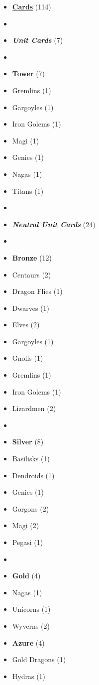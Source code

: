 \begin{multicols}{3}
\begin{itemize}[leftmargin=0pt, label={}, noitemsep]
  \item \textbf{\small{\underline{Cards}}} (114)
  \item
  \item \textbf{\emph{Unit Cards}} (7)
  \item
  \item \textbf{Tower} (7)
  \item Gremlins (1)
  \item Gargoyles (1)
  \item Iron Golems (1)
  \item Magi (1)
  \item Genies (1)
  \item Nagas (1)
  \item Titans (1)
  \item
  \item \textbf{\emph{Neutral Unit Cards}} (24)
  \item
  \item \textbf{Bronze} (12)
  \item Centaurs (2)
  \item Dragon Flies (1)
  \item Dwarves (1)
  \item Elves (2)
  \item Gargoyles (1)
  \item Gnolls (1)
  \item Gremlins (1)
  \item Iron Golems (1)
  \item Lizardmen (2)
  \item
  \item \textbf{Silver} (8)
  \item Basilisks (1)
  \item Dendroids (1)
  \item Genies (1)
  \item Gorgons (2)
  \item Magi (2)
  \item Pegasi (1)
  \item
  \item \textbf{Gold} (4)
  \item Nagas (1)
  \item Unicorns (1)
  \item Wyverns (2)
\columnbreak
  \item \textbf{Azure} (4)
  \item Gold Dragons (1)
  \item Hydras (1)

\end{itemize}
\end{multicols}
